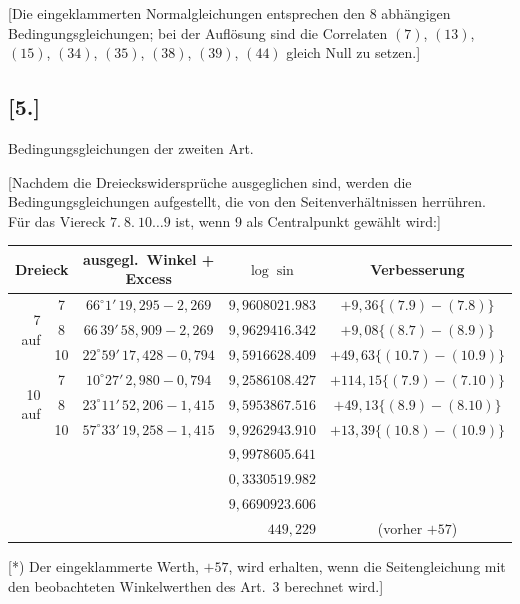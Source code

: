 \documentclass[12pt,a4paper]{article}
\theoremstyle{plain}
\theoremstyle{definition}
\theoremstyle{remark}
\begin{document}
[Die eingeklammerten Normalgleichungen entsprechen den 8 abh\"angigen Bedingungsgleichungen; bei der Aufl\"osung sind die Correlaten $(7)$, $(13)$, $(15)$, $(34)$, $(35)$, $(38)$, $(39)$, $(44)$ gleich Null zu setzen.]

\newpage
\subsection*{[5.]}
\label{subsec:netz5}

Bedingungsgleichungen der zweiten Art.

[Nachdem die Dreieckswiderspr\"uche ausgeglichen sind, werden die Bedingungsgleichungen aufgestellt, die von den Seitenverh\"altnissen herr\"uhren. F\"ur das Viereck $7.\ 8.\ 10 \ldots 9$ ist, wenn 9 als Centralpunkt gew\"ahlt wird:]

\begin{center}
\begin{tabular}{r|c|c|c|c}
\multicolumn{2}{c|}{Dreieck} & ausgegl.\ Winkel + Excess & $\log \sin$ & Verbesserung\\
\hline
\multirow{3}{*}{7 auf} & 7 & $66^{\circ}1'\,19{,}295 - 2{,}269$ & $9{,}9608021.983$ & $+9{,}36\{(7.9)-(7.8)\}$\\
 & 8 & $66\,39'\,58{,}909 - 2{,}269$ & $9{,}9629416.342$ & $+9{,}08\{(8.7)-(8.9)\}$\\
 & 10 & $22^{\circ}59'\,17{,}428 - 0{,}794$ & $9{,}5916628.409$ & $+49{,}63\{(10.7)-(10.9)\}$\\
\hline
\multirow{3}{*}{10 auf} & 7 & $10^{\circ}27'\,2{,}980 - 0{,}794$ & $9{,}2586108.427$ & $+114{,}15\{(7.9)-(7.10)\}$\\
 & 8 & $23^{\circ}11'\,52{,}206 - 1{,}415$ & $9{,}5953867.516$ & $+49{,}13\{(8.9)-(8.10)\}$\\
 & 10 & $57^{\circ}33'\,19{,}258 - 1{,}415$ & $9{,}9262943.910$ & $+13{,}39\{(10.8)-(10.9)\}$\\
\hline
\multicolumn{3}{c|}{} & $9{,}9978605.641$ & \\
\cline{3-4}
\multicolumn{3}{c|}{} & $0{,}3330519.982$ & \\
\cline{3-4}
\multicolumn{3}{c|}{} & $9{,}6690923.606$ & \\
\hline
\multicolumn{4}{r|}{$449{,}229$} & (vorher $+57$)\quad[*]\\
\end{tabular}
\end{center}

[*) Der eingeklammerte Werth, $+57$, wird erhalten, wenn die Seitengleichung mit den beobachteten Winkelwerthen des Art.\ 3 berechnet wird.]
\end{document}
